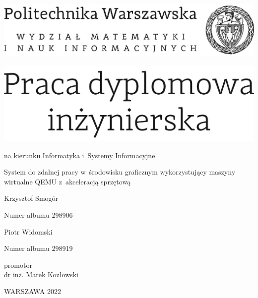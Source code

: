 \documentclass[12pt,twoside,a4paper]{article}
\newcommand{\discipline}{Informatyka i~Systemy Informacyjne}
\renewcommand{\title}{System do zdalnej pracy w~środowisku graficznym wykorzystujący maszyny wirtualne QEMU z~akceleracją sprzętową}
\newcommand{\supervisor}{dr inż. Marek Kozłowski}
\renewcommand{\year}{2022}
\newcommand{\authori}{Krzysztof Smogór}
\newcommand{\albumi}{298906}
\newcommand{\authorii}{Piotr Widomski}
\newcommand{\albumii}{298919}
\begin{document}
\pagestyle{empty}

\begin{center}

\includegraphics[scale=1.]{img/politechnika}
\vspace{40pt}

\includegraphics[scale=1.]{img/praca_inz}  %

{ \arial na kierunku \discipline

\vspace{30pt}
{\arial \large \title}

\vspace{40pt}

{\arial \huge \authori }

\vspace{5pt}

Numer albumu \albumi

\vspace {20pt}
{\arial \huge \authorii}

\vspace{5pt}

Numer albumu \albumii

\vspace{40pt}

promotor \\
{\arial \supervisor}

\vspace{15pt}


 \vfill
WARSZAWA \year \\
}
\end{center}


%
%
\end{document}
